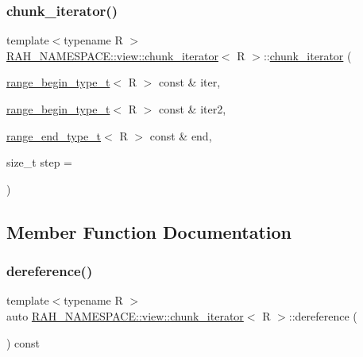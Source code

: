 \subsubsection{\texorpdfstring{chunk\_iterator()}{chunk\_iterator()}}
{\footnotesize\ttfamily template$<$typename R $>$ \\
\mbox{\hyperlink{struct_r_a_h___n_a_m_e_s_p_a_c_e_1_1view_1_1chunk__iterator}{R\+A\+H\+\_\+\+N\+A\+M\+E\+S\+P\+A\+C\+E\+::view\+::chunk\+\_\+iterator}}$<$ R $>$\+::\mbox{\hyperlink{struct_r_a_h___n_a_m_e_s_p_a_c_e_1_1view_1_1chunk__iterator}{chunk\+\_\+iterator}} (\begin{DoxyParamCaption}\item[{\mbox{\hyperlink{namespace_r_a_h___n_a_m_e_s_p_a_c_e_a46705781d6869d5151141f871ced1e9c}{range\+\_\+begin\+\_\+type\+\_\+t}}$<$ R $>$ const \&}]{iter,  }\item[{\mbox{\hyperlink{namespace_r_a_h___n_a_m_e_s_p_a_c_e_a46705781d6869d5151141f871ced1e9c}{range\+\_\+begin\+\_\+type\+\_\+t}}$<$ R $>$ const \&}]{iter2,  }\item[{\mbox{\hyperlink{namespace_r_a_h___n_a_m_e_s_p_a_c_e_aadeb8c12d454f4cc70bf80766871d3b2}{range\+\_\+end\+\_\+type\+\_\+t}}$<$ R $>$ const \&}]{end,  }\item[{size\+\_\+t}]{step = {} }\end{DoxyParamCaption})\hspace{0.3cm}{\ttfamily [inline]}}



\subsection{Member Function Documentation}
\mbox{\label{struct_r_a_h___n_a_m_e_s_p_a_c_e_1_1view_1_1chunk__iterator_a01511046d94dad1e8ea6fe1dd6d4a090}} 
\subsubsection{\texorpdfstring{dereference()}{dereference()}}
{\footnotesize\ttfamily template$<$typename R $>$ \\
auto \mbox{\hyperlink{struct_r_a_h___n_a_m_e_s_p_a_c_e_1_1view_1_1chunk__iterator}{R\+A\+H\+\_\+\+N\+A\+M\+E\+S\+P\+A\+C\+E\+::view\+::chunk\+\_\+iterator}}$<$ R $>$\+::dereference (\begin{DoxyParamCaption}{ }\end{DoxyParamCaption}) const\hspace{0.3cm}{\ttfamily [inline]}}

